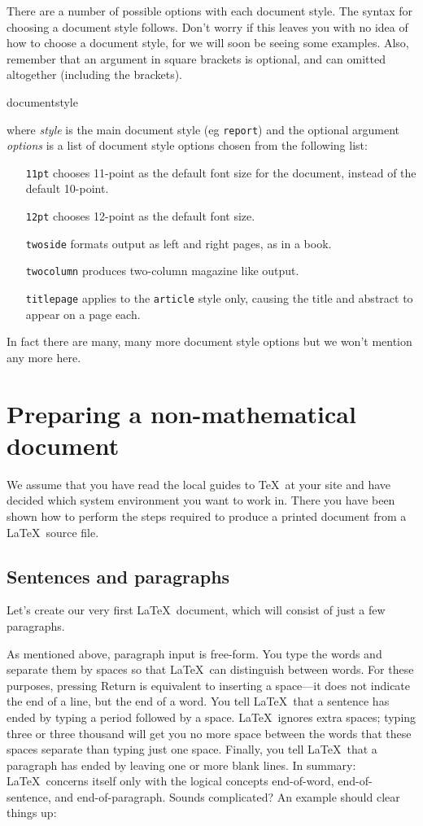 There are a number of possible options with each document style.  The syntax
for choosing a document style follows.  Don't worry if this leaves you with no idea
of how to choose a document style, for we will soon be seeing some examples.  Also,
remember that an argument in square brackets is optional, and can omitted
altogether (including the brackets).
\begin{syntax}{documentstyle}
\end{syntax}
where {\em style\/} is the main document style (eg {\tt report})
and the optional argument {\em options\/} is a list of document style options chosen
from the following list:
\begin{itemize}
\item[\tt 11pt] chooses 11-point as the default font size for the document, instead
			  of the default 10-point.
\item[\tt 12pt] chooses 12-point as the default font size.
\item[\tt twoside] formats output as left and right pages, as in a book.
\item[\tt twocolumn] produces two-column magazine like output.
\item[\tt titlepage] applies to the {\tt article} style only, causing the
	      title and abstract to appear on a page each.
\end{itemize}

In fact there are many, many more document style options but we
won't mention any more here.

\section{Preparing a non-mathematical document}
We assume that you have read the local guides to \TeX\ at your site and have
decided which system environment you want to work in.  There you have been
shown how to perform the steps required to produce a printed document from a
\LaTeX\ source file.

\subsection{Sentences and paragraphs}
Let's create our very first \LaTeX\ document, which will consist
of just a few paragraphs.

As mentioned above, paragraph input is free-form.  You type the words
and separate them by spaces so that \LaTeX\ can distinguish between
words.  For these purposes, pressing Return is equivalent to inserting
a space---it does not indicate the end of a line, but the end of a word.
You tell \LaTeX\ that a sentence has ended by typing a period followed
by a space.  \LaTeX\ ignores extra spaces; typing three or three thousand will
get you no more space between the words that these spaces separate than
typing just one space.  Finally, you tell \LaTeX\ that a paragraph has
ended by leaving one or more blank lines.
In summary: \LaTeX\ concerns itself only with the
logical concepts end-of-word, end-of-sentence, and end-of-paragraph.
Sounds complicated?  An example should clear things up:

